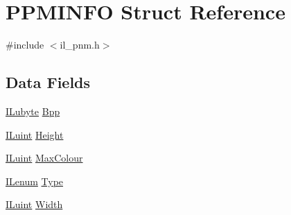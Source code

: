 \hypertarget{struct_p_p_m_i_n_f_o}{\section{P\-P\-M\-I\-N\-F\-O Struct Reference}
\label{struct_p_p_m_i_n_f_o}
}


{\ttfamily \#include $<$il\-\_\-pnm.\-h$>$}

\subsection*{Data Fields}
\begin{DoxyCompactItemize}
\item 
\hyperlink{il_8h_a8d2f04500100a86d1b00e98ab1b15a33}{I\-Lubyte} \hyperlink{struct_p_p_m_i_n_f_o_acb619433784a0e26c0f1f18b3700c9f7}{Bpp}
\item 
\hyperlink{il_8h_ac6508d0e9c19e32f32e00d54b5b8cf30}{I\-Luint} \hyperlink{struct_p_p_m_i_n_f_o_a8a8093d76b61a95fc96df24af29b107a}{Height}
\item 
\hyperlink{il_8h_ac6508d0e9c19e32f32e00d54b5b8cf30}{I\-Luint} \hyperlink{struct_p_p_m_i_n_f_o_aa49730f5f130f2f7d5c08991f5b77472}{Max\-Colour}
\item 
\hyperlink{il_8h_a1542f3a70c0c5370a30a1fa5ce349e2d}{I\-Lenum} \hyperlink{struct_p_p_m_i_n_f_o_a437e4fc3b579e2e7879dedd0fd2ac587}{Type}
\item 
\hyperlink{il_8h_ac6508d0e9c19e32f32e00d54b5b8cf30}{I\-Luint} \hyperlink{struct_p_p_m_i_n_f_o_a4146e7b2b0b4097e0e335f9b348392bf}{Width}
\end{DoxyCompactItemize}


